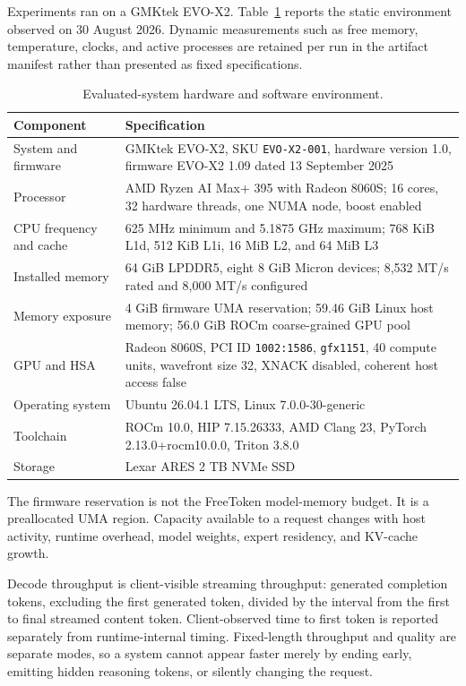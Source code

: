 \documentclass[10pt,letterpaper,twocolumn]{article}
\begin{document}
Experiments ran on a GMKtek EVO-X2. Table~\ref{tab:platform} reports the static environment observed on 30 August 2026. Dynamic measurements such as free memory, temperature, clocks, and active processes are retained per run in the artifact manifest rather than presented as fixed specifications.

\begin{table}[t]
\caption{Evaluated-system hardware and software environment.}
\label{tab:platform}
\centering
\small
\begin{tabularx}{\textwidth}{>{\raggedright\arraybackslash}p{}X}
\toprule
Component & Specification \\
\midrule
System and firmware & GMKtek EVO-X2, SKU \texttt{EVO-X2-001}, hardware version 1.0, firmware EVO-X2 1.09 dated 13 September 2025 \\
Processor & AMD Ryzen AI Max+ 395 with Radeon 8060S; 16 cores, 32 hardware threads, one NUMA node, boost enabled \\
CPU frequency and cache & 625 MHz minimum and 5.1875 GHz maximum; 768 KiB L1d, 512 KiB L1i, 16 MiB L2, and 64 MiB L3 \\
Installed memory & 64 GiB LPDDR5, eight 8 GiB Micron devices; 8,532 MT/s rated and 8,000 MT/s configured \\
Memory exposure & 4 GiB firmware UMA reservation; 59.46 GiB Linux host memory; 56.0 GiB ROCm coarse-grained GPU pool \\
GPU and HSA & Radeon 8060S, PCI ID \texttt{1002:1586}, \texttt{gfx1151}, 40 compute units, wavefront size 32, XNACK disabled, coherent host access false \\
Operating system & Ubuntu 26.04.1 LTS, Linux 7.0.0-30-generic \\
Toolchain & ROCm 10.0, HIP 7.15.26333, AMD Clang 23, PyTorch 2.13.0+rocm10.0.0, Triton 3.8.0 \\
Storage & Lexar ARES 2 TB NVMe SSD \\
\bottomrule
\end{tabularx}
\end{table}

The firmware reservation is not the FreeToken model-memory budget. It is a preallocated UMA region. Capacity available to a request changes with host activity, runtime overhead, model weights, expert residency, and KV-cache growth.

Decode throughput is client-visible streaming throughput: generated completion tokens, excluding the first generated token, divided by the interval from the first to final streamed content token. Client-observed time to first token is reported separately from runtime-internal timing. Fixed-length throughput and quality are separate modes, so a system cannot appear faster merely by ending early, emitting hidden reasoning tokens, or silently changing the request.
\end{document}
